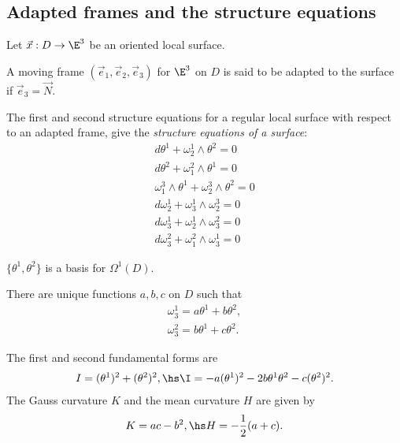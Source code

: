 \documentclass{article}
\begin{document}
\subsection{Adapted frames and the structure equations}

Let $\vec x: D \to \E^3$ be an oriented local surface.

\begin{definition}
	A moving frame $(\vec e_1, \vec e_2, \vec e_3)$ for $\E^3$ on $D$
	is said to be adapted to the surface if $\vec e_3 = \vec N$.
\end{definition}

\begin{proposition}[Notes 11.2]
	The first and second structure equations for a regular local surface
	with respect to an adapted frame, give the \emph{structure equations
		of a surface}:
	\begin{align*}
		d\theta^1 + \omega_2^1\wedge\theta^2 = 0                \\
		d\theta^2 + \omega_1^2\wedge\theta^1 = 0                \\
		\omega_1^3\wedge\theta^1 + \omega_2^3\wedge\theta^2 = 0 \\
		d\omega_2^1+\omega_3^1\wedge\omega_2^3 = 0              \\
		d\omega_3^1 + \omega_2^1 \wedge \omega_3^2 = 0          \\
		d\omega_3^2 + \omega_1^2 \wedge \omega_3^1 = 0
	\end{align*}
\end{proposition}

\begin{lemma}[Notes 11.3]
	$\{\theta^1, \theta^2\}$ is a basis for $\Omega^1(D)$.
\end{lemma}

\begin{lemma}[Notes 11.4]
	There are unique functions $a,b,c$ on $D$ such that
	\begin{align*}
		\omega_3^1 = a\theta^1+b\theta^2, \\
		\omega_3^2 = b\theta^1+c\theta^2.
	\end{align*}
\end{lemma}

\begin{proposition}[Notes 11.5]
	The first and second fundamental forms are
	\begin{align*}
		I = (\theta^1)^2 + (\theta^2)^2,\hs
		\I = -a(\theta^1)^2-2b\theta^1\theta^2-c(\theta^2)^2.
	\end{align*}
	The Gauss curvature $K$ and the mean curvature $H$ are given by
	\begin{align*}
		K=ac-b^2, \hs H=-\frac{1}{2}(a+c).
	\end{align*}
\end{proposition}
\end{document}
